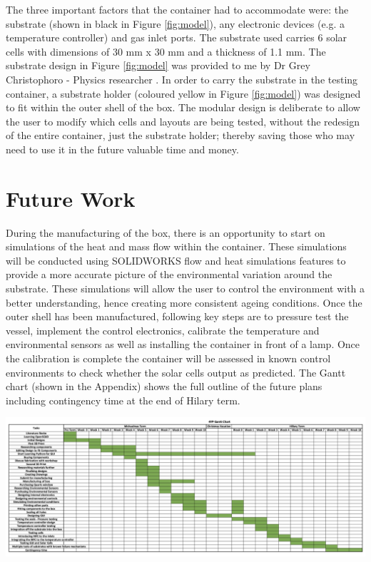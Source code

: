 \documentclass[a4paper,11pt]{article}
\begin{document}
\noindent The three important factors that the container had to accommodate were: the substrate (shown in black in Figure \ref{fig:model}), any electronic devices (e.g. a temperature controller)  and gas inlet ports. The substrate used carries 6 solar cells with dimensions of 30 mm x 30 mm and a thickness of 1.1 mm. The substrate design in Figure \ref{fig:model} was provided to me by Dr Grey Christophoro - Physics researcher \cite{RN48}. In order to carry the substrate in the testing container, a substrate holder (coloured yellow in Figure \ref{fig:model}) was designed to fit within the outer shell of the box. The modular design is deliberate to allow the user to modify which cells and layouts are being tested, without the redesign of the entire container, just the substrate holder; thereby saving those who may need to use it in the future valuable time and money. 
\section{Future Work}
During the manufacturing of the box, there is an opportunity to start on simulations of the heat and mass flow within the container. These simulations will be conducted using SOLIDWORKS flow and heat simulations features to provide a more accurate picture of the environmental variation around the substrate. These simulations will allow the user to control the environment with a better understanding, hence creating more consistent ageing conditions. Once the outer shell has been manufactured, following key steps are to pressure test the vessel, implement the control electronics, calibrate the temperature and environmental sensors as well as installing the container in front of a lamp. Once the calibration is complete the container will be assessed in known control environments to check whether the solar cells output as predicted. The Gantt chart (shown in the Appendix) shows the full outline of the future plans including contingency time at the end of Hilary term. 
\begin{singlespace}

\end{singlespace}

\appendix
\appendixpage
\begin{appendix}
\includegraphics[width=1.7\linewidth, angle=270]{gantt}
\end{appendix}
\end{document}
